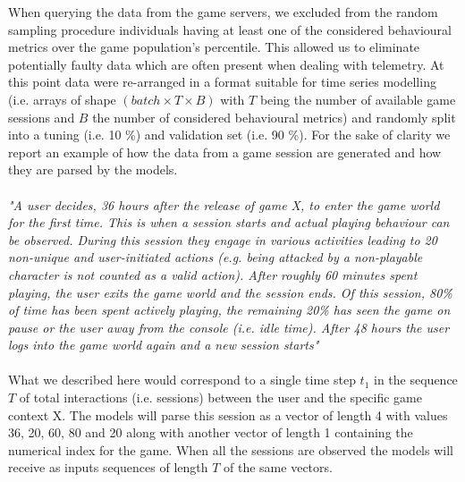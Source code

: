 

When querying the data from the game servers, we excluded from the random sampling procedure individuals having at least one of the considered behavioural metrics over the game population's  percentile. This allowed us to eliminate potentially faulty data which are often present when dealing with telemetry. At this point data were re-arranged in a format suitable for time series modelling (i.e. arrays of shape $(batch\times T \times B)$ with $T$ being the number of available game sessions and $B$ the number of considered behavioural metrics) and randomly split into a tuning (i.e. 10 \%) and validation set (i.e. 90 \%). For the sake of clarity we report an example of how the data from a game session are generated and how they are parsed by the models.\\
\\
\textit{
"A user decides, 36 hours after the release of game X, to enter the game world for the first time. This is when a session starts and actual playing behaviour can be observed. During this session they engage in various activities leading to 20 non-unique and user-initiated actions (e.g. being attacked by a non-playable character is not counted as a valid action). After roughly 60 minutes spent playing, the user exits the game world and the session ends. Of this session, 80\% of time has been spent actively playing, the remaining 20\% has seen the game on pause or the user away from the console (i.e. idle time). After 48 hours the user logs into the game world again and a new session starts"}\\
\\
What we described here would correspond to a single time step $t_{1}$ in the sequence $T$ of total interactions (i.e. sessions) between the user and the specific game context X. The models will parse this session as a vector of length 4 with values 36, 20, 60, 80 and 20 along with another vector of length 1 containing the numerical index for the game. When all the sessions are observed the models will receive as inputs sequences of length $T$ of the same vectors. 

